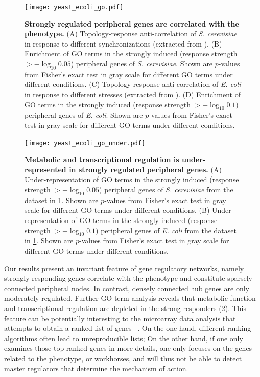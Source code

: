 \begin{figure}[H]
\begin{center}
\texttt{[image: yeast\_ecoli\_go.pdf]}
\end{center}
\caption[GO term enrichment of strongly regulated genes]{
{\bf Strongly regulated peripheral genes are correlated with the phenotype.}
(A) Topology-response
anti-correlation of \emph{S. cerevisiae} in response to different synchronizations
(extracted from \citealp{Spellman1998,Cho1998}). 
(B) Enrichment of GO
terms in the strongly induced (response strength $> -\log_{10}0.05$) 
peripheral genes of \emph{S. cerevisiae}. Shown 
are $p$-values
from Fisher's exact test in gray scale for different GO terms under different 
conditions.
(C) Topology-response anti-correlation of \emph{E. coli} in response 
to different stresses (extracted from \citealp{Jozefczuk2010}). 
(D) Enrichment of GO terms
in the strongly induced (response strength $> -\log_{10}0.1$) 
peripheral genes of \emph{E. coli}. Shown are $p$-values
from Fisher's exact test in gray scale for different GO terms under different 
conditions. 
}
\label{fig:ecoli_yeast_go}
\end{figure}


\begin{figure}[!ht]
\begin{center}
\texttt{[image: yeast\_ecoli\_go\_under.pdf]}
\end{center}
\caption[GO term depletion of strongly regulated genes]{
{\bf Metabolic and transcriptional regulation is under-represented in 
strongly regulated peripheral genes.}
(A) Under-representation of GO
terms in the strongly induced (response strength $> -\log_{10}0.05$) 
peripheral genes of \emph{S. cerevisiae} from
the dataset in \ref{fig:ecoli_yeast_go}. Shown 
are $p$-values
from Fisher's exact test in gray scale for different GO terms under different 
conditions.
(B) Under-representation of GO terms
in the strongly induced (response strength $> -\log_{10}0.1$) peripheral genes 
of \emph{E. coli} from the dataset 
in \ref{fig:ecoli_yeast_go}. Shown are $p$-values
from Fisher's exact test in gray scale for different GO terms under different 
conditions. 
}
\label{fig:ecoli_yeast_go_under}
\end{figure}

Our results present an invariant feature of gene regulatory
networks, namely strongly responding genes correlate with
the phenotype and constitute sparsely connected peripheral nodes.
In contrast, densely connected hub genes are only moderately
regulated. Further GO term analysis reveals that metabolic
function and transcriptional regulation are depleted in the
strong responders (\ref{fig:ecoli_yeast_go_under}).
This feature can be potentially interesting to 
the microarray data analysis that attempts to obtain
a ranked list of genes~%
\citep{Boulesteix2009,Smyth2004}. On the one hand, different ranking
algorithms often lead to unreproducible lists; On the other
hand, if one only examines those top-ranked genes in more
details, one only focuses on the genes related to the phenotype,
or workhorses, and will thus not be able to detect master regulators
that determine the mechanism of action.

